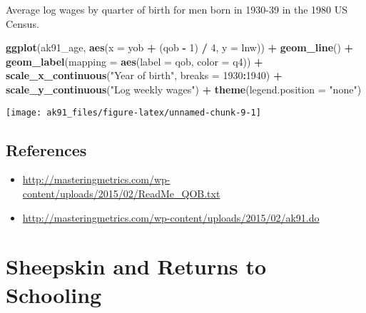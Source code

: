 \documentclass[]{book}
\newenvironment{Shaded}{\begin{snugshade}}{\end{snugshade}}
\newcommand{\DataTypeTok}[1]{\textcolor[rgb]{0.13,0.29,0.53}{#1}}
\newcommand{\DecValTok}[1]{\textcolor[rgb]{0.00,0.00,0.81}{#1}}
\newcommand{\KeywordTok}[1]{\textcolor[rgb]{0.13,0.29,0.53}{\textbf{#1}}}
\newcommand{\NormalTok}[1]{#1}
\newcommand{\OperatorTok}[1]{\textcolor[rgb]{0.81,0.36,0.00}{\textbf{#1}}}
\newcommand{\StringTok}[1]{\textcolor[rgb]{0.31,0.60,0.02}{#1}}
\providecommand{\tightlist}{%
  \setlength{\itemsep}{0pt}\setlength{\parskip}{0pt}}
\theoremstyle{definition}
\theoremstyle{definition}
\theoremstyle{definition}
\theoremstyle{remark}
\begin{document}
Average log wages by quarter of birth for men born in 1930-39 in the
1980 US Census.

\begin{Shaded}
\begin{Highlighting}[]
\KeywordTok{ggplot}\NormalTok{(ak91_age, }\KeywordTok{aes}\NormalTok{(}\DataTypeTok{x =}\NormalTok{ yob }\OperatorTok{+}\StringTok{ }\NormalTok{(qob }\OperatorTok{-}\StringTok{ }\DecValTok{1}\NormalTok{) }\OperatorTok{/}\StringTok{ }\DecValTok{4}\NormalTok{, }\DataTypeTok{y =}\NormalTok{ lnw)) }\OperatorTok{+}
\StringTok{  }\KeywordTok{geom_line}\NormalTok{() }\OperatorTok{+}
\StringTok{  }\KeywordTok{geom_label}\NormalTok{(}\DataTypeTok{mapping =} \KeywordTok{aes}\NormalTok{(}\DataTypeTok{label =}\NormalTok{ qob, }\DataTypeTok{color =}\NormalTok{ q4)) }\OperatorTok{+}
\StringTok{  }\KeywordTok{scale_x_continuous}\NormalTok{(}\StringTok{"Year of birth"}\NormalTok{, }\DataTypeTok{breaks =} \DecValTok{1930}\OperatorTok{:}\DecValTok{1940}\NormalTok{) }\OperatorTok{+}
\StringTok{  }\KeywordTok{scale_y_continuous}\NormalTok{(}\StringTok{"Log weekly wages"}\NormalTok{) }\OperatorTok{+}
\StringTok{  }\KeywordTok{theme}\NormalTok{(}\DataTypeTok{legend.position =} \StringTok{"none"}\NormalTok{)}
\end{Highlighting}
\end{Shaded}

\begin{center}\texttt{[image: ak91\_files/figure-latex/unnamed-chunk-9-1]} \end{center}

\hypertarget{references-8}{%
\section*{References}\label{references-8}}

\begin{itemize}
\tightlist
\item
  \url{http://masteringmetrics.com/wp-content/uploads/2015/02/ReadMe_QOB.txt}
\item
  \url{http://masteringmetrics.com/wp-content/uploads/2015/02/ak91.do}
\end{itemize}

\hypertarget{sheepskin-and-returns-to-schooling}{%
\chapter{Sheepskin and Returns to
Schooling}\label{sheepskin-and-returns-to-schooling}}
\end{document}
